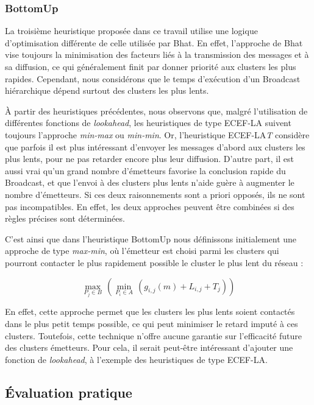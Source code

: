 \subsubsection*{BottomUp}

La troisième heuristique proposée dans ce travail utilise une logique
d'optimisation différente de celle utilisée par Bhat. En effet, l'approche
de Bhat vise toujours la minimisation des facteurs liés à la transmission
des messages et à sa diffusion, ce qui généralement finit par donner
priorité aux  clusters les plus rapides. Cependant, nous considérons
que le temps d'exécution d'un Broadcast hiérarchique dépend surtout
des  clusters les plus lents.

À partir des heuristiques précédentes, nous observons que, malgré
l'utilisation de différentes fonctions de \emph{lookahead}, les heuristiques
de type ECEF-LA suivent toujours l'approche \emph{min-max} ou \emph{min-min}.
Or, l'heuristique ECEF-LA\emph{T} considère que parfois il est plus
intéressant d'envoyer les messages d'abord aux  clusters les plus lents,
pour ne pas retarder encore plus leur diffusion. D'autre part, il
est aussi vrai qu'un grand nombre d'émetteurs favorise la conclusion
rapide du Broadcast, et que l'envoi à des  clusters plus lents n'aide
guère à augmenter le nombre d'émetteurs. Si ces deux raisonnements
sont a priori opposés, ils ne sont pas incompatibles. En effet, les
deux approches peuvent être combinées si des règles précises sont
déterminées.

C'est ainsi que dans l'heuristique BottomUp nous définissons initialement
une approche de type \emph{max-min}, où l'émetteur est choisi parmi
les  clusters qui pourront contacter le plus rapidement possible le
 cluster le plus lent du réseau :

\[
\max_{P_{j}\in B}\,(\min_{P_{i}\in A}\,(g_{i,j}(m)+L_{i,j}+T_{j}))\]


En effet, cette approche permet que les  clusters les plus lents soient
contactés dans le plus petit temps possible, ce qui peut minimiser
le retard imputé à ces  clusters. Toutefois, cette technique n'offre
aucune garantie sur l'efficacité future des  clusters émetteurs. Pour
cela, il serait peut-être intéressant d'ajouter une fonction de \emph{lookahead},
à l'exemple des heuristiques de type ECEF-LA.


\subsection{Évaluation pratique}

